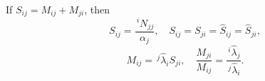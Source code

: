 If $S_{ij} = M_{ij} + M_{ji}$, then
$$S_{ij} = \frac{\,^{i}\!N_{jj}}{\alpha_j}, \quad S_{ij} = S_{ji} = \hat{S}_{ij} = \hat{S}_{ji},$$
$$M_{ij} = \,^{j}\!\hat{\lambda}_i S_{ji}, \quad \frac{M_{ji}}{M_{ij}} = \frac{\,^{i}\!\hat{\lambda}_j}{\,^{j}\!\hat{\lambda}_i}.$$
